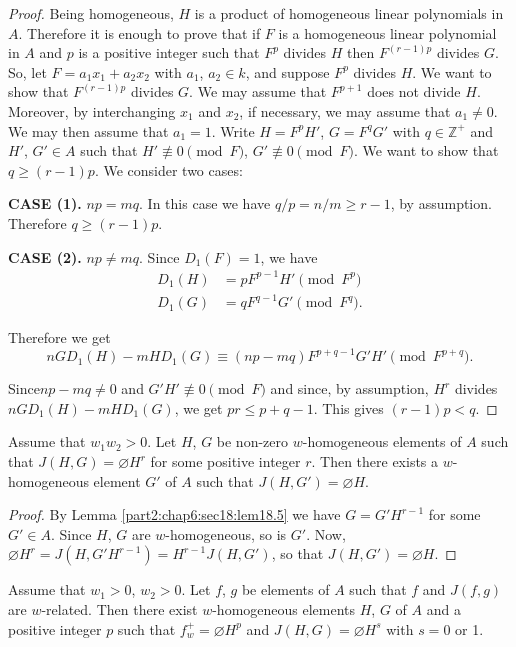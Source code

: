 \begin{proof}
  Being homogeneous, $H$ is a product of homogeneous linear
  polynomials in $A$. Therefore it is enough to prove that if $F$ is a
  homogeneous linear polynomial in $A$ and $p$ is a positive integer
  such that $F^p$ divides $H$ then $F^{(r-1)p}$ divides $G$. So, let
  $F= a_1 x_1 + a_2 x_2$ with $a_1$, $a_2 \in k$, and suppose $F^p$
  divides $H$. We want to show that $F^{(r-1)p}$ divides $G$. We may
  assume that $F^{p+1}$ does not divide $H$. Moreover, by
  interchanging $x_1$ and $x_2$, if necessary, we may assume that $a_1
  \neq 0$. We may then assume that $a_1 =1$. Write $H= F^p H'$, $G=
  F^qG'$ with $q \in \mathbb{Z}^+$ and $H'$, $G'\in A$ such that $H'
  \nequiv 0 \pmod{F}$, $G' \nequiv 0 \pmod{F}$. We want to show that
  $q \geq (r-1)p$. We consider two cases:

\textbf{CASE (1).} $np = mq$. In this case we have $q/p=n/m \geq r-1$,
by assumption. Therefore $q \geq (r-1)p$.

\textbf{CASE (2).} $np \neq mq$. Since $D_1 (F)=1$, we have
\begin{align*}
  D_1 (H) & = p F^{p-1}H'  \pmod{F^p}\\
  D_1 (G) & = q F^{q-1}G'  \pmod{F^q}. 
\end{align*}

Therefore we get
$$
n G D_1 (H) - m HD_1 (G) \equiv (np - mq) F^{p+q-1} G' H' \pmod{F^{p+q}}.
$$

Since\pageoriginale $np -mq \neq 0$ and $G'H' \nequiv 0 \pmod{F}$ and
since, by assumption, $H^r$ divides $nGD_1 (H) - m HD_1 (G)$, we get
$pr \leq p +q-1$. This gives $(r-1)p < q$.
\end{proof}

\begin{coro}\label{part2:chap6:sec18:coro18.6} 
  Assume that $w_1 w_2 > 0$. Let $H$, $G$ be non-zero $w$-homogeneous
  elements of $A$ such that $J(H, G)= \diameter H^r$ for some positive
  integer $r$. Then there exists a $w$-homogeneous element $G'$ of $A$
  such that $J(H, G') = \diameter H$. 
\end{coro}

\begin{proof}
  By Lemma \ref{part2:chap6:sec18:lem18.5} we have $G=G' H^{r-1}$ for
  some $G' \in A$. Since $H$, $G$ are $w$-homogeneous, so is
  $G'$. Now, $\diameter H^r= J(H, G' H^{r-1})= H^{r-1}J(H, G')$, so
  that $J(H, G')= \diameter H$.
\end{proof}

\begin{coro}\label{part2:chap6:sec18:coro18.7} 
  Assume that $w_1> 0$, $w_2>0$. Let $f$, $g$ be elements of $A$ such
  that $f$ and $J(f, g)$ are $w$-related. Then there exist
  $w$-homogeneous elements $H$, $G$ of $A$ and a positive integer $p$
  such that $f_w^+= \diameter H^p$ and $J(H, G)= \diameter H^s$ with
  $s= 0$ or 1.
\end{coro}


